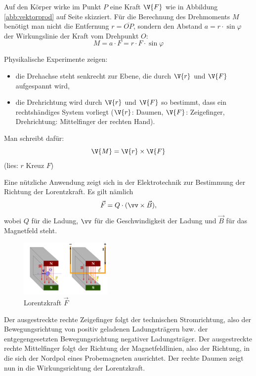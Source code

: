 \documentclass[%
11pt,%
twoside,%
titlepage,%
german,%
headsepline%
]{scrartcl}
\begin{document}
Auf den Körper wirke im Punkt $P$ eine Kraft $\V{F}$ wie in Abbildung \ref{abb:vektorprod} auf Seite \pageref{abb:vektorprod} skizziert. Für die Berechnung des Drehmoments $M$ benötigt man nicht die Entfernung $r =\overline{OP}$, sondern den Abstand $a =r\cdot\sin\varphi$ der Wirkungslinie der Kraft vom Drehpunkt $O$:
$$M =a\cdot F =r\cdot F\cdot \sin\varphi$$

Physikalische Experimente zeigen:
\begin{itemize}
\item die Drehachse steht senkrecht zur Ebene, die durch
$\V{r}$ und $\V{F}$ aufgespannt wird,
\item die Drehrichtung wird durch $\V{r}$ und $\V{F}$ so bestimmt,
dass ein rechtshändiges System vorliegt ($\V{r}$: Daumen,
$\V{F}$: Zeigefinger, Drehrichtung: Mittelfinger der rechten Hand).
\end{itemize}
Man schreibt dafür:
$$\V{M}=\V{r}\times\V{F}$$
(lies: \glqq $r$ Kreuz $F$\grqq)

\begin{bsp}
Eine nützliche Anwendung zeigt sich in der Elektrotechnik zur Bestimmung der Richtung der Lorentzkraft. Es gilt nämlich
$$\vec{F}=Q\cdot(\vv\times\vec{B}),$$
wobei $Q$ für die Ladung, $\vv$ für die Geschwindigkeit der Ladung und $\vec{B}$ für das Magnetfeld steht.
\begin{figure}
\begin{center}
\includegraphics[width=0.4\textwidth]{pictures/lorentz.png}
\caption{Lorentzkraft $\vec{F}$}
\end{center}
\end{figure}
Der ausgestreckte rechte Zeigefinger folgt der technischen Stromrichtung, also der Bewegungsrichtung von positiv geladenen Ladungsträgern bzw. der entgegengesetzten Bewegungsrichtung negativer Ladungsträger.
Der ausgestreckte rechte Mittelfinger folgt der Richtung der Magnetfeldlinien, also der Richtung, in die sich der Nordpol eines Probemagneten ausrichtet.
Der rechte Daumen zeigt nun in die Wirkungsrichtung der Lorentzkraft.
\end{bsp}

\cleardoublepage

\listoffigures
\end{document}
